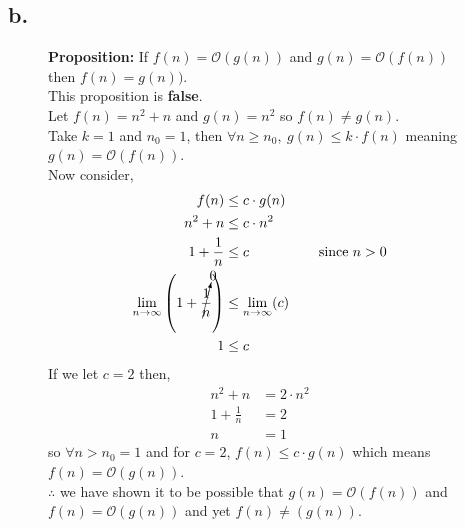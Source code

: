 \documentclass{article}
\begin{document}
    
        \subsection*{b.}

            \begin{figure}[!ht]

                \centering
                \begin{minipage}{0.9\textwidth}
                    \textbf{Proposition:} If $f(n) = \mathcal{O}(g(n))$ and $g(n) = \mathcal{O}(f(n))$ then $f(n) = g(n))$.\\
                    
                    This proposition is \textbf{false}.\\

                    Let $f(n) = n^{2} + n$ and $g(n) = n^{2}$ so $f(n) \neq g(n)$.\\
                    Take $k = 1$ and $n_{0} = 1$, then $\forall n \geq n_{0}, \hspace{3pt} g(n) \leq k \cdot f(n)$
                    meaning $g(n) = \mathcal{O}(f(n))$.\\
                    Now consider,
                    \begin{align*}
                        f(n)                                                            &\leq   c \cdot g(n)\\
                        n^{2} + n                                                       &\leq   c \cdot n^{2}\\
                        1 + \frac{1}{n}                                                 &\leq   c \hspace*{50pt} \text{since} \hspace*{3pt} n > 0\\
                        \lim_{n \to \infty} \left(1 + \cancelto{0}{\frac{1}{n}}\right)  &\leq   \lim_{n \to \infty} (c)\\
                        1                                                               &\leq   c
                    \end{align*}
                    If we let $c = 2$ then,
                    \begin{align*}
                        n^{2} + n                                                       &=      2 \cdot n^{2}\\
                        1 + \frac{1}{n}                                                 &=      2\\
                        n                                                               &=      1
                    \end{align*}
                    so $\forall n > n_{0} = 1$ and for $c = 2$, $f(n) \leq c \cdot g(n)$ which means $f(n) = \mathcal{O}(g(n))$.\\

                    $\therefore$ we have shown it to be possible that $g(n) = \mathcal{O}(f(n))$ and $f(n) = \mathcal{O}(g(n))$ and yet $f(n)\neq (g(n))$.
                \end{minipage}

            \end{figure}
\end{document}

